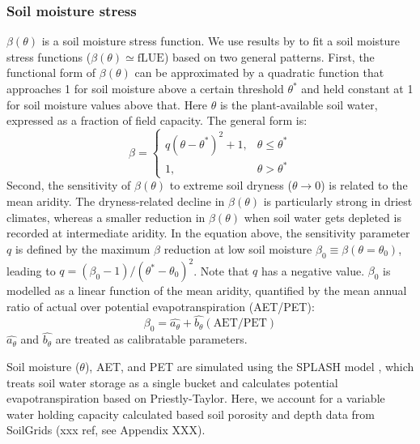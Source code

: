 \documentclass{myreport}
\begin{document}
\subsubsection{Soil moisture stress}
\label{sec:soilmstress}
$\beta(\theta)$ is a soil moisture stress function. We use results by \cite{stocker18newphyt} to fit a soil moisture stress functions ($\beta(\theta)\simeq\text{fLUE}$) based on two general patterns. First, the functional form of $\beta(\theta)$ can be approximated by a quadratic function that approaches 1 for soil moisture above a certain threshold $\theta^{\ast}$ and held constant at 1 for soil moisture values above that. Here $\theta$ is the plant-available soil water, expressed as a fraction of field capacity. The general form is:
\begin{equation}
    \beta =
\begin{cases}
    q(\theta - \theta^{\ast})^2 + 1,& \theta \leq \theta^{\ast}\\
    1,              & \theta > \theta^{\ast}
\end{cases}
\end{equation}
Second, the sensitivity of $\beta(\theta)$ to extreme soil dryness ($\theta \rightarrow 0$) is related to the mean aridity. The dryness-related decline in $\beta(\theta)$ is particularly strong in driest climates, whereas a smaller reduction in $\beta(\theta)$ when soil water gets depleted is recorded at intermediate aridity. In the equation above, the sensitivity parameter $q$ is defined by the maximum $\beta$ reduction at low soil moisture $\beta_0\equiv\beta(\theta=\theta_0)$, leading to $q=(\beta_0-1)/(\theta^{\ast}-\theta_0)^2$. Note that $q$ has a negative value. $\beta_0$ is modelled as a linear function of the mean aridity, quantified by the mean annual ratio of actual over potential evapotranspiration (AET/PET):
\begin{equation}
\label{eq:soilmsensitivity}
\beta_0 = \widehat{a_{\theta}} + \widehat{b_{\theta}} (\text{AET}/\text{PET})
\end{equation}
$\widehat{a_{\theta}}$ and $\widehat{b_{\theta}}$ are treated as calibratable parameters. 

Soil moisture ($\theta$), AET, and PET are simulated using the SPLASH model \cite{davis17}, which treats soil water storage as a single bucket and calculates potential evapotranspiration based on Priestly-Taylor. Here, we account for a variable water holding capacity calculated based soil porosity and depth data from SoilGrids (xxx ref, see Appendix XXX).
\end{document}

